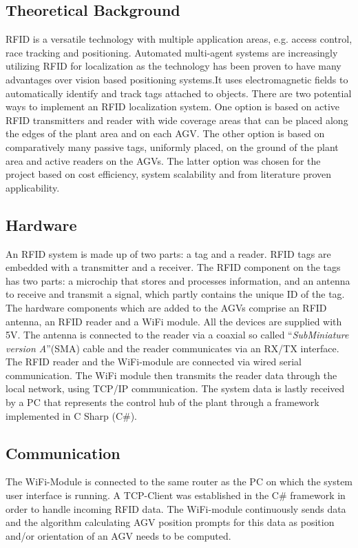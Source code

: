 \subsection*{Theoretical Background}
RFID is a versatile technology with multiple application areas, e.g. access control, race tracking and positioning. Automated multi-agent systems are increasingly utilizing RFID for localization as the technology has been proven to have many advantages over vision based positioning systems.It uses electromagnetic fields to automatically identify and track tags attached to objects. There are two potential ways to implement an RFID localization system. One option is based on active RFID transmitters and reader with wide coverage areas that can be placed along the edges of the plant area and on each AGV. The other option is based on comparatively many passive tags, uniformly placed, on the ground of the plant area and active readers on the AGVs. The latter option was chosen for the project based on cost efficiency, system scalability and from literature proven applicability.
\subsection*{Hardware
}
An RFID system is made up of two parts: a tag and a reader. RFID tags are embedded with a transmitter and a receiver. The RFID component on the tags has two parts: a microchip that stores and processes information, and an antenna to receive and transmit a signal, which partly contains the unique ID of the tag. The hardware components which are added to the AGVs comprise an RFID antenna, an RFID reader and a WiFi module. All the devices are supplied with 5V. The antenna is connected to the reader via a coaxial so called ``\textit{SubMiniature version A}''(SMA) cable and the reader communicates via an RX/TX interface. The RFID reader and the WiFi-module are connected via wired serial communication. The WiFi module then transmits the reader data through the local network, using TCP/IP communication. The system data is lastly received by a PC that represents the control hub of the plant through a framework implemented in C Sharp (C\#). 
\subsection*{Communication
}
The WiFi-Module is connected to the same router as the PC on which the system user interface is running. A TCP-Client was established in the C\# framework in order to handle incoming RFID data. The WiFi-module continuously sends data and the algorithm calculating AGV position prompts for this data as position and/or orientation of an AGV needs to be computed.
